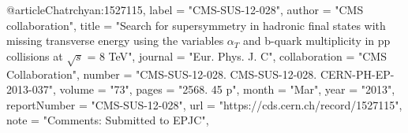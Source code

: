 @article{Chatrchyan:1527115,                                                    
      label          = "CMS-SUS-12-028",                                        
      author        = "{CMS collaboration}",                                    
      title         = "{Search for supersymmetry in hadronic final states with  
                       missing transverse energy using the variables $\alpha_T$ 
                       and b-quark multiplicity in pp collisions at $\sqrt{s}$ = 8                                                                              
                       TeV}",                                                   
      journal       = "Eur. Phys. J. C",                                        
      collaboration = "CMS Collaboration",                                      
      number        = "CMS-SUS-12-028. CMS-SUS-12-028. CERN-PH-EP-2013-037",    
      volume        = "73",                                                     
      pages         = "2568. 45 p",                                             
      month         = "Mar",                                                    
      year          = "2013",                                                   
      reportNumber  = "CMS-SUS-12-028",                                         
      url           = "https://cds.cern.ch/record/1527115",                     
      note          = "Comments: Submitted to EPJC",                            
}   
